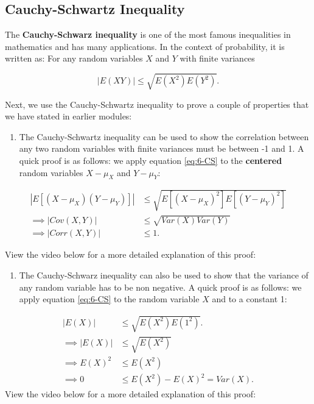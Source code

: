 \documentclass[
]{book}
\providecommand{\tightlist}{%
  \setlength{\itemsep}{0pt}\setlength{\parskip}{0pt}}
\begin{document}
\subsection{Cauchy-Schwartz Inequality}\label{cauchy-schwartz-inequality}

The \textbf{Cauchy-Schwarz inequality} is one of the most famous inequalities in mathematics and has many applications. In the context of probability, it is written as: For any random variables \(X\) and \(Y\) with finite variances

\begin{equation} 
|E(XY)| \leq \sqrt{E(X^2)E(Y^2)}.
\label{eq:6-CS}
\end{equation}

Next, we use the Cauchy-Schwartz inequality to prove a couple of properties that we have stated in earlier modules:

\begin{enumerate}
\def\labelenumi{\arabic{enumi}.}
\tightlist
\item
  The Cauchy-Schwartz inequality can be used to show the correlation between any two random variables with finite variances must be between -1 and 1. A quick proof is as follows: we apply equation \eqref{eq:6-CS} to the \textbf{centered} random variables \(X - \mu_X\) and \(Y - \mu_Y\):
\end{enumerate}

\[
\begin{split}
|E[(X - \mu_X)(Y - \mu_Y)]| & \leq \sqrt{E[(X - \mu_X)^2] E[(Y - \mu_Y)^2]} \\
\implies |Cov(X,Y)| & \leq \sqrt{Var(X) Var(Y)} \\
\implies |Corr(X,Y)| & \leq 1.
\end{split}
\]

View the video below for a more detailed explanation of this proof:

\begin{enumerate}
\def\labelenumi{\arabic{enumi}.}
\setcounter{enumi}{1}
\tightlist
\item
  The Cauchy-Schwarz inequality can also be used to show that the variance of any random variable has to be non negative. A quick proof is as follows: we apply equation \eqref{eq:6-CS} to the random variable \(X\) and to a constant 1:
\end{enumerate}

\[
\begin{split}
|E(X)| & \leq \sqrt{E(X^2)E(1^2)}. \\
\implies |E(X)| & \leq \sqrt{E(X^2)} \\
\implies E(X)^2 & \leq E(X^2) \\
\implies 0 & \leq E(X^2) - E(X)^2 = Var(X).
\end{split}
\]
View the video below for a more detailed explanation of this proof:
\end{document}
